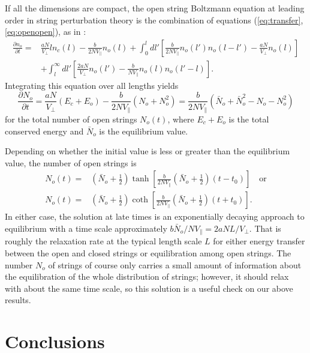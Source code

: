 \documentclass[a4paper,11pt]{article}
\begin{document}
{{{{{{{{{{{{If all the dimensions are compact, the open string Boltzmann equation
at leading order in string perturbation theory is the combination of
equations (\ref{eq:transfer},\ref{eq:openopen}), as in \cite{Lee:1997iz}:
\begin{equation}\begin{split}
\frac{\partial n_o}{\partial t} =& \frac{aN}{V_\perp} ln_c(l) -
\frac{b}{2NV_\|} n_o(l)+\int_0^ldl'\left[\frac{b}{2NV_\|}n_o(l')n_o(l-l')
-\frac{aN}{V_\perp}n_o(l)\right]\\ 
&+\int_l^\infty dl'\left[\frac{2aN}{V_\perp}n_o(l') 
-\frac{b}{NV_\|}n_o(l)n_o(l'-l)\right] .
\end{split}\end{equation}
Integrating this equation over all lengths yields 
\begin{equation}
\frac{\partial N_o}{\partial t} = \frac{aN}{V_\perp}(E_c+E_o)-\frac{b}{2NV_\|}
(N_o+N_o^2)= \frac{b}{2NV_\|}\left(\bar{N}_o+\bar{N}_o^2-N_o-N_o^2\right)
\end{equation}
for the total number of open strings $N_o(t)$, where $E_c+E_o$ is the total
conserved energy and $\bar{N}_o$ is the equilibrium value.

Depending on whether the initial value is less or greater than the equilibrium
value, the number of open strings is
\begin{equation}\begin{split}
N_o(t) =& \left(\bar{N}_o+\frac 12\right)\tanh\left[\frac{b}{2NV_\|}
\left(\bar{N}_o+\frac 12\right)(t-t_0)\right]\quad\text{or}\\
N_o(t) =&\left(\bar{N}_o+\frac 12\right)\coth\left[\frac{b}{2NV_\|}
\left(\bar{N}_o+\frac 12\right)(t+t_0)\right] .\end{split}\end{equation}
In either case, the solution at late times is an exponentially decaying 
approach to equilibrium with a time scale approximately 
$b\bar{N}_o/NV_\| = 2aNL/V_\perp$. That is roughly the relaxation rate
at the typical length scale $L$
for either energy transfer between the open and closed strings or 
equilibration among open strings. The number $N_o$ of strings of course only 
carries a small amount of information about the equilibration of the whole
distribution of strings; however, it should relax with about the same time
scale, so this solution is a useful check on our above results.


\section{Conclusions}\label{sec:conclusions}

}}}}}}}}}}}}
\end{document}
